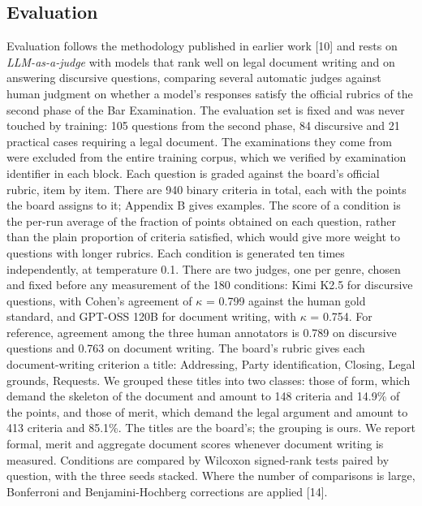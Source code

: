 \documentclass{IOS-Book-Article}
\begin{document}
\subsection{Evaluation}
Evaluation follows the methodology published in earlier work [10] and rests on \emph{LLM-as-a-judge} with models that rank well on legal document writing and on answering discursive questions, comparing several automatic judges against human judgment on whether a model's responses satisfy the official rubrics of the second phase of the Bar Examination.
The evaluation set is fixed and was never touched by training: 105 questions from the second phase, 84 discursive and 21 practical cases requiring a legal document. The examinations they come from were excluded from the entire training corpus, which we verified by examination identifier in each block.
Each question is graded against the board's official rubric, item by item. There are 940 binary criteria in total, each with the points the board assigns to it; Appendix B gives examples. The score of a condition is the per-run average of the fraction of points obtained on each question, rather than the plain proportion of criteria satisfied, which would give more weight to questions with longer rubrics. Each condition is generated ten times independently, at temperature 0.1.
There are two judges, one per genre, chosen and fixed before any measurement of the 180 conditions: Kimi K2.5 for discursive questions, with Cohen's agreement of $\kappa$ = 0.799 against the human gold standard, and GPT-OSS 120B for document writing, with $\kappa$ = 0.754. For reference, agreement among the three human annotators is 0.789 on discursive questions and 0.763 on document writing.
The board's rubric gives each document-writing criterion a title: Addressing, Party identification, Closing, Legal grounds, Requests. We grouped these titles into two classes: those of form, which demand the skeleton of the document and amount to 148 criteria and 14.9\% of the points, and those of merit, which demand the legal argument and amount to 413 criteria and 85.1\%. The titles are the board's; the grouping is ours. We report formal, merit and aggregate document scores whenever document writing is measured.
Conditions are compared by Wilcoxon signed-rank tests paired by question, with the three seeds stacked. Where the number of comparisons is large, Bonferroni and Benjamini-Hochberg corrections are applied [14].
\end{document}
